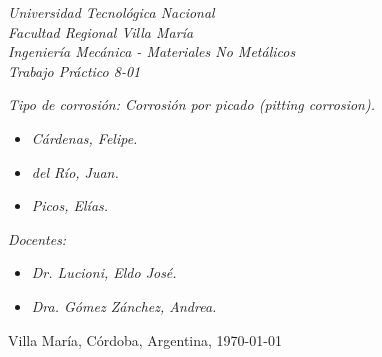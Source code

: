 \begin{titlepage}
	
	\begin{center}
		{\huge \textit{Universidad Tecnológica Nacional}}\\
        \vspace{0.5cm}
		{\LARGE \textit{Facultad Regional Villa María}}\\
		\vspace{1.5cm}
        {\LARGE{\textit{Ingeniería Mecánica - Materiales No Metálicos}}}\\
		\vspace{1.5cm}
        \LARGE{\textit{Trabajo Práctico 8-01}}
	\end{center}
	
	\vfill

    \textit{Tipo de corrosión: Corrosión por picado (\textit{pitting corrosion}).}
	\begin{itemize}
        \item \textit{Cárdenas, Felipe.}
        \item \textit{del Río, Juan.}
        \item \textit{Picos, Elías.}
	\end{itemize}
    
	\textit{Docentes:}
	\begin{itemize}
		\item \textit{Dr. Lucioni, Eldo José.}
		\item \textit{Dra. Gómez Zánchez, Andrea.}
	\end{itemize}
	\begin{center}
		Villa María, Córdoba, Argentina, \today
	\end{center}
	
\end{titlepage}
